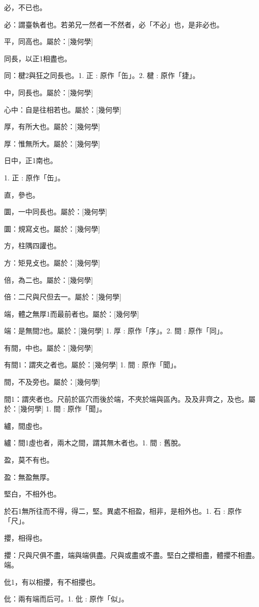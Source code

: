 \begin{pinyinscope}
必，不已也。

必：謂臺執者也。若弟兄一然者一不然者，必「不必」也，是非必也。

平，同高也。屬於：[幾何學]



同長，以正1相盡也。

同：楗2與狂之同長也。1. 正 : 原作「缶」。2. 楗 : 原作「捷」。

中，同長也。屬於：[幾何學]

心中：自是往相若也。屬於：[幾何學]

厚，有所大也。屬於：[幾何學]

厚：惟無所大。屬於：[幾何學]

日中，正1南也。

1. 正 : 原作「缶」。

直，參也。



圜，一中同長也。屬於：[幾何學]

圜：規寫攴也。屬於：[幾何學]

方，柱隅四讙也。

方：矩見攴也。屬於：[幾何學]

倍，為二也。屬於：[幾何學]

倍：二尺與尺但去一。屬於：[幾何學]

端，體之無厚1而最前者也。屬於：[幾何學]

端：是無間2也。屬於：[幾何學] 
1. 厚 : 原作「序」。2. 間 : 原作「同」。

有間，中也。屬於：[幾何學]

有間1：謂夾之者也。屬於：[幾何學] 
1. 間 : 原作「聞」。

間，不及旁也。屬於：[幾何學]

間1：謂夾者也。尺前於區穴而後於端，不夾於端與區內。及及非齊之，及也。屬於：[幾何學] 
1. 間 : 原作「聞」。

纑，間虛也。

纑：間1虛也者，兩木之間，謂其無木者也。1. 間 : 舊脫。

盈，莫不有也。

盈：無盈無厚。

堅白，不相外也。

於石1無所往而不得，得二，堅。異處不相盈，相非，是相外也。1. 石 : 原作「尺」。

攖，相得也。

攖：尺與尺俱不盡，端與端俱盡。尺與或盡或不盡。堅白之攖相盡，體攖不相盡。端。

仳1，有以相攖，有不相攖也。

仳：兩有端而后可。1. 仳 : 原作「似」。


\end{pinyinscope}
